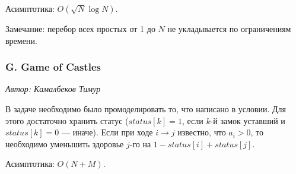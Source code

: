 \documentclass[10pt, a4paper]{article}
\newcommand{\problemauthor}[1]{
\begin{flushright}
\textit{Автор: #1}
\end{flushright}
}
\begin{document}
Асимптотика: $O(\sqrt{N} \log{N})$.

Замечание: перебор всех простых от 1 до $N$ не укладывается по ограничениям времени.



\subsubsection*{G. Game of Castles} 

\problemauthor{Камалбеков Тимур}

В задаче необходимо было промоделировать  то, что написано в условии. Для этого достаточно хранить статус ($status[k] = 1$, если $k$-й замок уставший и $status[k] = 0$ --- иначе). Если при ходе $i \rightarrow j$ известно, что $a_i > 0$, то необходимо уменьшить здоровье $j$-го на $1 - status[i] + status[j]$.

Асимптотика: $O(N + M)$.
\end{document}

